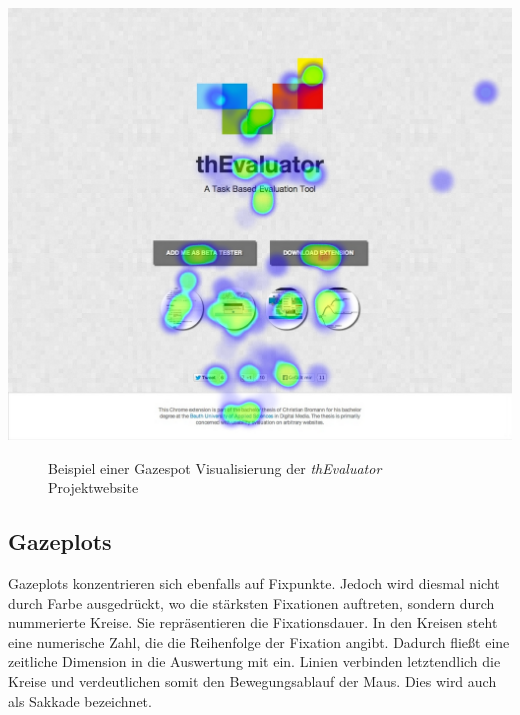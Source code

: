 \vspace{0.3cm}
\begin{center}
\includegraphics[scale=0.35]{./images/gazespot}
\end{center}
\begin{figure}[htb]
   \centering
   \caption{Beispiel einer Gazespot Visualisierung der \textit{thEvaluator} Projektwebsite}
    \label{gazespot}
\end{figure}


\subsection{Gazeplots}

Gazeplots konzentrieren sich ebenfalls auf Fixpunkte. Jedoch wird diesmal nicht durch Farbe ausgedrückt, wo die stärksten \Gls{Fixationen} auftreten, sondern durch nummerierte Kreise. Sie repräsentieren die Fixationsdauer. In den Kreisen steht eine numerische Zahl, die die Reihenfolge der Fixation angibt. Dadurch fließt eine zeitliche Dimension in die Auswertung mit ein. Linien verbinden letztendlich die Kreise und verdeutlichen somit den Bewegungsablauf der Maus. Dies wird auch als Sakkade bezeichnet.

